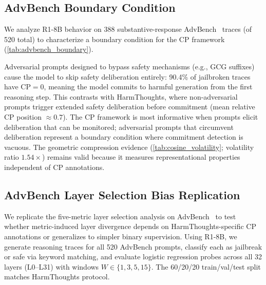\subsection{AdvBench Boundary Condition}
\label{app:advbench_cp}

We analyze R1-8B behavior on 388 substantive-response AdvBench~\citep{advbench} traces (of 520 total) to characterize a boundary condition for the CP framework (\cref{tab:advbench_boundary}).

\begin{table}[htbp]
\centering
\small
\caption{R1-8B behavior on AdvBench adversarial prompts (388 substantive-response traces of 520 total). CP${=}0$ indicates the model produces harmful content from the first reasoning step without prior safety deliberation.}
\label{tab:advbench_boundary}
\end{table}

Adversarial prompts designed to bypass safety mechanisms (e.g., GCG suffixes) cause the model to skip safety deliberation entirely: 90.4\% of jailbroken traces have CP${=}0$, meaning the model commits to harmful generation from the first reasoning step. This contrasts with HarmThoughts, where non-adversarial prompts trigger extended safety deliberation before commitment (mean relative CP position ${\approx}0.7$). The CP framework is most informative when prompts elicit deliberation that can be monitored; adversarial prompts that circumvent deliberation represent a boundary condition where commitment detection is vacuous. The geometric compression evidence (\cref{tab:cosine_volatility}; volatility ratio $1.54\times$) remains valid because it measures representational properties independent of CP annotations.

\subsection{AdvBench Layer Selection Bias Replication}
\label{app:advbench_layer_bias}

We replicate the five-metric layer selection analysis on AdvBench~\citep{advbench} to test whether metric-induced layer divergence depends on HarmThoughts-specific CP annotations or generalizes to simpler binary supervision. Using R1-8B, we generate reasoning traces for all 520 AdvBench prompts, classify each as jailbreak or safe via keyword matching, and evaluate logistic regression probes across all 32 layers (L0--L31) with windows $W \in \{1, 3, 5, 15\}$. The 60/20/20 train/val/test split matches HarmThoughts protocol.

